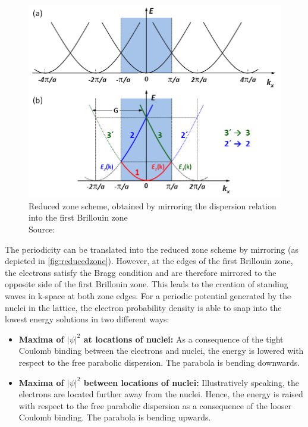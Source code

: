 \begin{figure}
	\centering
	\includegraphics[width=.6\textwidth]{./img/reducedzone.png}
	\caption{Reduced zone scheme, obtained by mirroring the dispersion relation into the first Brillouin zone\\ Source: \cite{graz}}
	\label{fig:reducedzone}
\end{figure}
The periodicity can be translated into the reduced zone scheme by mirroring (as depicted in \autoref{fig:reducedzone}).
However, at the edges of the first Brillouin zone, the electrons satisfy the Bragg condition and are therefore mirrored to the opposite side of the first Brillouin zone.
This leads to the creation of standing waves in k-space at both zone edges.
For a periodic potential generated by the nuclei in the lattice, the electron probability density is able to snap into the lowest energy solutions in two different ways:
\begin{itemize}
\item \textbf{Maxima of $|\psi|^2$ at locations of nuclei:} As a consequence of the tight Coulomb binding between the electrons and nuclei, the energy is lowered with respect to the free parabolic dispersion. The parabola is bending downwards.
	\item \textbf{Maxima of $|\psi|^2$ between locations of nuclei:} Illustratively speaking, the electrons are located further away from the nuclei. Hence, the energy is raised with respect to the free parabolic dispersion as a consequence of the looser Coulomb binding. The parabola is bending upwards.
\end{itemize}


